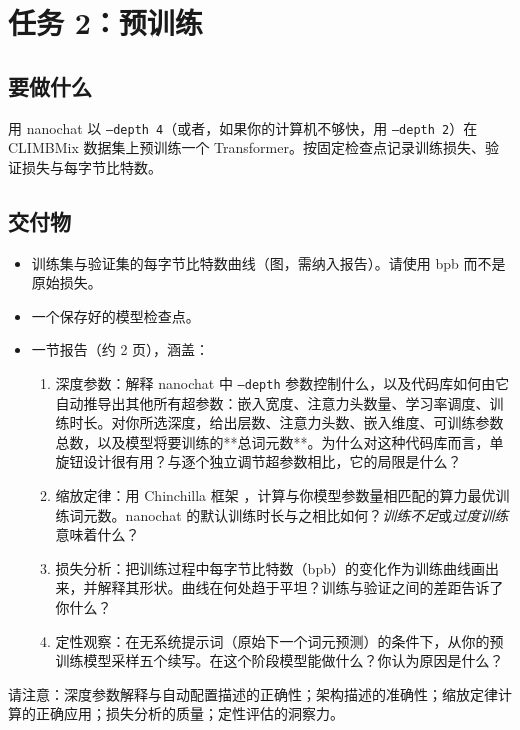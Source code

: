 \section{任务 2：预训练}
\label{sec:task2}

\subsection{要做什么}

用 nanochat 以 \texttt{--depth~4}（或者，如果你的计算机不够快，用 \texttt{--depth~2}）在 CLIMBMix 数据集上预训练一个 Transformer。按固定检查点记录训练损失、验证损失与每字节比特数。

\subsection{交付物}

\begin{itemize}
    \item 训练集与验证集的每字节比特数曲线（图，需纳入报告）。请使用 bpb 而不是原始损失。
    \item 一个保存好的模型检查点。
    \item 一节报告（约 2 页），涵盖：
          \begin{enumerate}
              \item 深度参数：解释 nanochat 中 \texttt{--depth} 参数控制什么，以及代码库如何由它自动推导出其他所有超参数：嵌入宽度、注意力头数量、学习率调度、训练时长。对你所选深度，给出层数、注意力头数、嵌入维度、可训练参数总数，以及模型将要训练的**总词元数**。为什么对这种代码库而言，单旋钮设计很有用？与逐个独立调节超参数相比，它的局限是什么？
              \item 缩放定律：用 Chinchilla 框架 \citep{10.5555/3600270.3602446}，计算与你模型参数量相匹配的算力最优训练词元数。nanochat 的默认训练时长与之相比如何？{\em 训练不足}或{\em 过度训练}意味着什么？
              \item 损失分析：把训练过程中每字节比特数（bpb）的变化作为训练曲线画出来，并解释其形状。曲线在何处趋于平坦？训练与验证之间的差距告诉了你什么？
              \item 定性观察：在无系统提示词（原始下一个词元预测）的条件下，从你的预训练模型采样五个续写。在这个阶段模型能做什么？你认为原因是什么？
          \end{enumerate}
\end{itemize}
%
%
请注意：深度参数解释与自动配置描述的正确性；架构描述的准确性；缩放定律计算的正确应用；损失分析的质量；定性评估的洞察力。

